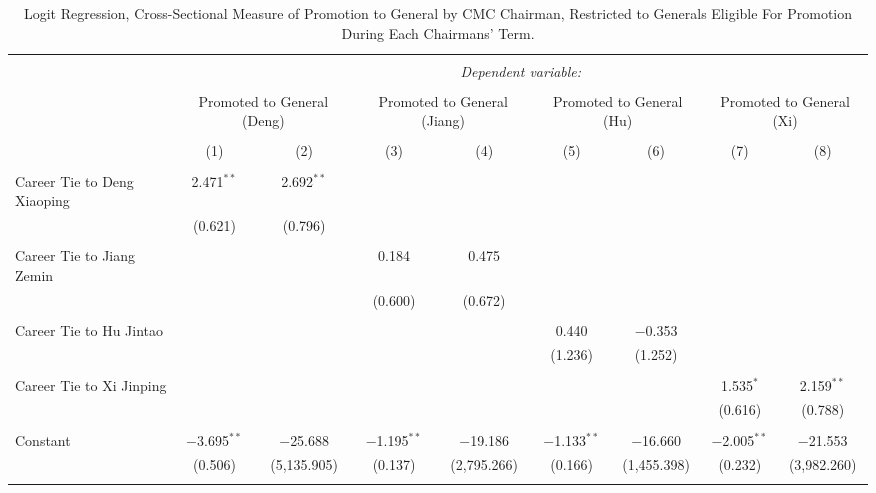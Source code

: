 
\begin{table}[!htbp] \centering 
  \caption{Logit Regression, Cross-Sectional Measure of Promotion to General by CMC Chairman, Restricted to Generals Eligible For Promotion During Each Chairmans' Term.} 
  \label{table_a18} 
\begin{tabular}{@{\extracolsep{5pt}}lcccccccc} 
\\[-1.8ex]\hline 
\hline \\[-1.8ex] 
 & \multicolumn{8}{c}{\textit{Dependent variable:}} \\ 
\cline{2-9} 
\\[-1.8ex] & \multicolumn{2}{c}{Promoted to General (Deng)} & \multicolumn{2}{c}{Promoted to General (Jiang)} & \multicolumn{2}{c}{Promoted to General (Hu)} & \multicolumn{2}{c}{Promoted to General (Xi)} \\ 
\\[-1.8ex] & (1) & (2) & (3) & (4) & (5) & (6) & (7) & (8)\\ 
\hline \\[-1.8ex] 
 Career Tie to Deng Xiaoping & 2.471$^{**}$ & 2.692$^{**}$ &  &  &  &  &  &  \\ 
  & (0.621) & (0.796) &  &  &  &  &  &  \\ 
  & & & & & & & & \\ 
 Career Tie to Jiang Zemin &  &  & 0.184 & 0.475 &  &  &  &  \\ 
  &  &  & (0.600) & (0.672) &  &  &  &  \\ 
  & & & & & & & & \\ 
 Career Tie to Hu Jintao &  &  &  &  & 0.440 & $-$0.353 &  &  \\ 
  &  &  &  &  & (1.236) & (1.252) &  &  \\ 
  & & & & & & & & \\ 
 Career Tie to Xi Jinping &  &  &  &  &  &  & 1.535$^{*}$ & 2.159$^{**}$ \\ 
  &  &  &  &  &  &  & (0.616) & (0.788) \\ 
  & & & & & & & & \\ 
 Constant & $-$3.695$^{**}$ & $-$25.688 & $-$1.195$^{**}$ & $-$19.186 & $-$1.133$^{**}$ & $-$16.660 & $-$2.005$^{**}$ & $-$21.553 \\ 
  & (0.506) & (5,135.905) & (0.137) & (2,795.266) & (0.166) & (1,455.398) & (0.232) & (3,982.260) \\ 
  & & & & & & & & \\ 

\end{tabular}
\end{table}
